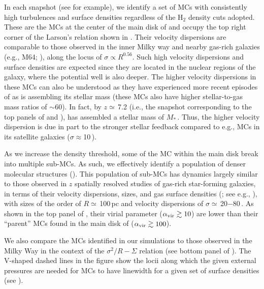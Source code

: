 \documentclass[iop]{emulateapj}
\begin{document}
In each snapshot (see  for example),
we identify a set of MCs with consistently high turbulences and surface densities
regardless of the H$_2$ density cuts adopted.
These are the MCs at the center of the main disk of \flower and
occupy the top right corner of the Larson's relation shown in .
Their velocity dispersions are comparable to those observed in the inner Milky way and
nearby gas-rich galaxies (e.g., M64; \citealt{Oka01a, Rosolowsky05a, Heyer09a}),
along the locus of $\sigma\propto R^{0.56}$.
Such high velocity dispersions and surface densities are expected since
they are located in the nuclear regions of the
galaxy, where the potential well is also deeper. The higher velocity dispersions
in these MCs can also be understood as they have experienced more recent episodes
of \SF as \flower is assembling its stellar mass (these MCs also have higher stellar-to-gas mass ratios of $\sim$60).
In fact, by $z\simeq$\,7.2 (i.e., the snapshot corresponding
to the top panels of  and ), \flower has assembled
a stellar mass of $M_*$\,\Msun. Thus, the higher velocity dispersion
is due in part to the stronger stellar feedback compared to e.g., MCs in its satellite galaxies ($\sigma\approx$10\,\kms).

As we increase the density threshold, some of the MC within the main disk break
into multiple sub-MCs.
As such, we effectively identify a population of denser molecular structures ().
This population of sub-MCs has dynamics largely
similar to those observed
in $z$ spatially resolved studies of gas-rich star-forming galaxies, in
terms of their velocity dispersions, sizes, and gas surface densities (; see
e.g., \citealt{Swinbank11a}),
with sizes of the order of $R\simeq$\,100\,pc and velocity
dispersions of $\sigma\simeq$\,20$-$80\,\kms. 
As shown in the top panel of , their virial parameter ($\alpha_{\rm vir}\gtrsim10$)
are lower than their ``parent'' MCs found in the main disk of \flower ($\alpha_{\rm vir}\gtrsim100$). 

We also compare the MCs identified in our simulations to 
those observed in the Milky Way in the context of the $\sigma^2/R - \Sigma$ relation (see bottom panel of 
). The V-shaped dashed lines in the figure show the locii along which the given external pressures are needed for 
MCs to have linewidth for a given set of surface densities (see ). 
\end{document}
